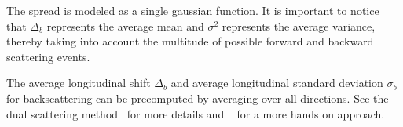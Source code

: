 The spread is modeled as a single gaussian function. It is important to notice that $\Delta_b$ represents the average mean and $\sigma^2$ represents the average variance, thereby taking into account the multitude of possible forward and backward scattering events.

The average longitudinal shift $\Delta_b$ and average longitudinal standard deviation $\sigma_b$ for backscattering can be precomputed by averaging over all directions. See the dual scattering method~\cite{zinke} for more details and ~\cite{sadeghi} for a more hands on approach.






